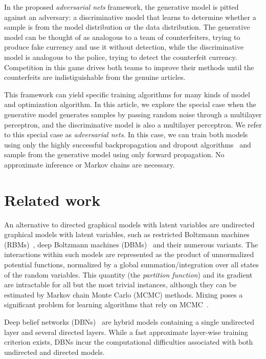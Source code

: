 \documentclass{article}
\begin{document}
In the proposed {\em adversarial nets} framework, the generative model is pitted against an
adversary: a discriminative model that learns to determine whether a sample is
from the model distribution or the data distribution. The generative model can be thought of
as analogous to a team of counterfeiters, trying to produce fake currency and use it without
detection, while the discriminative model is analogous to the police, trying to detect the
counterfeit currency. Competition in this game drives both teams to improve their methods until the counterfeits
are indistiguishable from the genuine articles.

This framework can yield specific training algorithms for many kinds of model and optimization
algorithm. In this article, we explore the special case when the generative model generates
samples by passing random noise through a multilayer perceptron, and the discriminative model
is also a multilayer perceptron. We refer to this special case as {\em adversarial nets}.
In this case, we can train both models using only
the highly successful backpropagation and dropout algorithms~\citep{Hinton-et-al-arxiv2012} 
and sample from the generative
model using only forward propagation. No approximate inference or Markov chains are necessary.

\section{Related work}
\label{sec:related}

An alternative to directed graphical models with latent variables are undirected graphical models
with latent variables, such as restricted Boltzmann machines (RBMs)~\citep{Smolensky86,Hinton06}, 
deep Boltzmann machines (DBMs)~\citep{Salakhutdinov+Hinton-2009-small} and their numerous variants.
The interactions within such models are represented as the product of
unnormalized potential functions, normalized by a global
summation/integration over all states of the random variables.
This quantity (the \textit{partition function}) and
its gradient are intractable for all but the most trivial
instances, although they can be estimated by Markov chain Monte
Carlo (MCMC) methods. Mixing poses a significant problem for learning
algorithms that rely on
MCMC~\citep{Bengio-et-al-ICML2013,Bengio-et-al-ICML2014}.

Deep belief networks (DBNs)~\citep{Hinton06} are hybrid models containing a single undirected layer and several directed layers.
While a fast approximate layer-wise training criterion exists, DBNs incur the computational
difficulties associated with both undirected and directed models.
\end{document}
